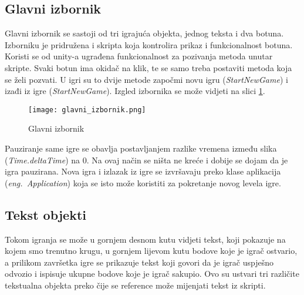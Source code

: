 \subsection{Glavni izbornik}
Glavni izbornik se sastoji od tri igrajuća objekta, jednog teksta i dva botuna. Izborniku je pridružena i skripta koja kontrolira prikaz i funkcionalnost botuna. Koristi se od unity-a ugrađena funkcionalnost za pozivanja metoda unutar skripte. Svaki botun ima okidač na klik, te se samo treba postaviti metoda koja se želi pozvati. U igri su to dvije metode započmi novu igru (\emph{StartNewGame}) i izađi iz igre (\emph{StartNewGame}). Izgled izbornika se može vidjeti na slici \ref{fig:glavniIzbornik}.
\begin{figure}[h]
	\texttt{[image: glavni\_izbornik.png]}
	\centering
	\caption{Glavni izbornik}
	\label{fig:glavniIzbornik}
\end{figure}
\newline
Pauziranje same igre se obavlja postavljanjem razlike vremena između slika (\emph{Time.deltaTime}) na 0. Na ovaj način se ništa ne kreće i dobije se dojam da je igra pauzirana. Nova igra i izlazak iz igre se izvršavaju preko klase aplikacija (\emph{eng.~Application}) koja se isto može koristiti za pokretanje novog levela igre.
\newpage
\subsection{Tekst objekti}
Tokom igranja se može u gornjem desnom kutu vidjeti tekst, koji pokazuje na kojem smo trenutno krugu, u gornjem lijevom kutu bodove koje je igrač ostvario, a prilikom završetka igre se prikazuje tekst koji govori da je igrač uspješno odvozio i ispisuje ukupne bodove koje je igrač sakupio. Ovo su ustvari tri različite tekstualna objekta preko čije se reference može mijenjati tekst iz skripti. 